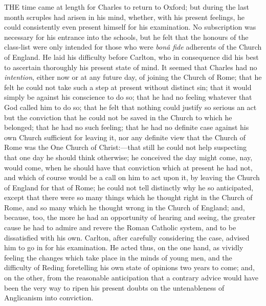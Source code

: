 THE time came at length for Charles to
return to Oxford; but during the last month scruples had arisen in his
mind, whether, with his present feelings, he could consistently even
present himself for his examination. No subscription was necessary for
his entrance into the schools, but he felt that the honours of the
class-list were only intended for those who were \emph{bonâ fide}
adherents of the Church of England. He laid his difficulty before
Carlton, who in consequence did his best to ascertain thoroughly his
present state of mind. It seemed that Charles had no \emph{intention},
either now or at any future day, of joining the Church of Rome; that
he felt he could not take such a step at present without distinct sin;
that it would simply be against his conscience to do so; that he had
no feeling whatever that God called him to do so; that he felt that
nothing could justify so serious an act but the conviction that he
could not be saved in the Church to which he belonged; that he had no
such feeling; that he had no definite case against his own Church
sufficient for leaving it, nor any definite view that the Church of
Rome was the One Church of Christ:—that still he could not
help suspecting that one day he should think otherwise; he conceived
the day might come, nay, would come, when he should have that
conviction which at present he had not, and which of course would be a
call on him to act upon it, by leaving the Church of England for that
of Rome; he could not tell distinctly why he so anticipated, except
that there were so many things which he thought right in the Church of
Rome, and so many which he thought wrong in the Church of England;
and, because, too, the more he had an opportunity of hearing and
seeing, the greater cause he had to admire and revere the Roman
Catholic system, and to be dissatisfied with his own. Carlton, after
carefully considering the case, advised him to go in for his
examination. He acted thus, on the one hand, as vividly feeling the
changes which take place in the minds of young men, and the difficulty
of Reding foretelling his own state of opinions two years to come;
and, on the other, from the reasonable anticipation that a contrary
advice would have been the very way to ripen his present doubts on the
untenableness of Anglicanism into conviction.


